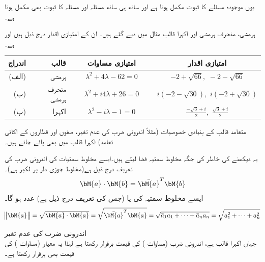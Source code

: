 یوں موجودہ مسئلے کا ثبوت مکمل ہوتا ہے اور ساتھ ہی ساتھ مسئلہ  اور مسئلہ  کا ثبوت بھی مکمل ہوتا ہے۔

ہرمشی، منحرف ہرمشی اور اکہرا قالب مثال  میں دیے گئے ہیں۔ ان کے امتیازی اقدار درج ذیل ہیں   اور  ہے۔

\begin{tabular}{rrcc}
اندراج& قالب& امتیازی مساوات& امتیازی اقدار\\
\hline
(الف)& ہرمشی&
$\phantom{xxx}\lambda^2+4\lambda-62=0\phantom{xxx}$ & $-2+\sqrt{66},\,\,-2-\sqrt{66}$\Tstrut\Bstrut\\
(ب)& منحرف ہرمشی&
$\lambda^2+i4\lambda+26=0$ & $i(-2-\sqrt{30}),\,\, i(-2+\sqrt{30})$\\
(پ)& اکہرا&
$\lambda^2-i\lambda-1=0$ & $\frac{-\sqrt{3}+i}{2},\,\,\frac{\sqrt{3}+i}{2}$
\end{tabular}

متعامد قالب کے بنیادی خصوصیات (مثلاً اندرونی ضرب کی عدم تغیر، صفوں اور قطاروں کے  اکائی تعامد) اکہرا قالب میں بھی پائے جاتے ہیں۔ 

یہ دیکھنے کی خاطر   کی جگہ مخلوط سمتیہ فضا  لیتے ہیں۔ایسے مخلوط سمتیات کی اندرونی ضرب کی تعریف درج ذیل ہے(مخلوط جوڑی دار پر لکیر ہے)۔
\begin{align}\label{مساوات_امتیازی_اندرونی_ضرب_مخلوط}
\bM{a}\cdot \bM{b}=\bar{\bM{a}}^T\bM{b}
\end{align}
ایسے  مخلوط سمتیہ کی  یا  (جس کی تعریف درج ذیل ہے)   عدد ہو گا۔ 
\begin{align}\label{مساوات_امتیازی_معیار_مخلوط}
\norm{\bM{a}}=\sqrt{\bM{a}\cdot\bM{a}}=\sqrt{\bar{\bM{a}}^T\bM{a}}=\sqrt{\bar{a}_1a_1+\cdots+\bar{a}_na_n}=\sqrt{a_1^2+\cdots+a_n^2}
\end{align}

\quad اندرونی ضرب کی عدم تغیر\\
  جہاں  اکہرا قالب ہے، اندرونی ضرب (مساوات ) کی قیمت برقرار رکھتا ہے لہٰذا یہ معیار (مساوات ) کی قیمت بھی برقرار رکھتا ہے۔

